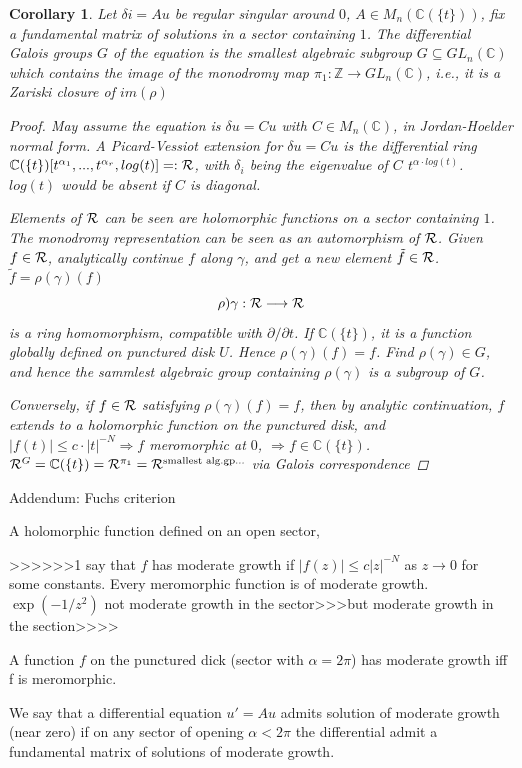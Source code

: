 \documentclass[11pt]{article}
\newtheorem{cor}[thm]{Corollary}
\newcommand{\pd}{\partial}
\newcommand{\cplx}{\mathbb C}
\newcommand{\intg}{\mathbb Z}
\newcommand{\calr}{{\cal R}}
\newcommand{\Lrta}{\Longrightarrow}
\newcommand{\lrta}{\longrightarrow}
\begin{document}
\begin{cor}
Let $\delta i= Au$ be regular singular around $0$, $A\in M_n(\cplx(\{t\}))$, fix a fundamental matrix of solutions in a sector containing $1$. The differential Galois groups $G$ of the equation is the smallest algebraic subgroup $G\subseteq GL_n(\cplx)$ which contains the image of the monodromy map $\pi_1:\intg\lrta GL_n(\cplx)$, i.e., it is a Zariski closure of  $im(\rho)$
\begin{proof}
May assume the equation is $\delta u =C u$ with $C\in M_n(\cplx)$, in Jordan-Hoelder normal form. A Picard-Vessiot extension for $\delta u= C u$ is the differential ring $\cplx(\{t\})[t^{\alpha_1},...,t^{\alpha_r},log(t)]=:\calr$, with $\delta_i$ being the eigenvalue of $C$ $t^{\alpha\cdot log(t)}$. $log(t)$ would be absent if $C$ is diagonal.  

Elements of $\calr$ can be seen are holomorphic functions on a sector containing $1$. The monodromy representation can be seen as an automorphism of $\calr$. Given $f\in\calr$, analytically continue $f$ along $\gamma$, and get a new element $\tilde{f}\in\calr$. $\tilde{f}=\rho(\gamma)(f)$ 
$$
\rho)\gamma: \calr\lrta \calr
$$
 is a ring homomorphism, compatible with $\pd/\pd t$. If $\cplx(\{t\})$, it is a function globally defined on punctured disk $U$. Hence $\rho(\gamma)(f)=f$. Find $\rho(\gamma)\in G$, and hence the sammlest algebraic group containing $\rho(\gamma)$ is a subgroup of $G$.

 Conversely, if $f\in \calr$ satisfying $\rho(\gamma)(f)=f$, then by analytic continuation, $f$ extends to a holomorphic function on the punctured disk, and $|f(t)|\leq c\cdot |t|^{-N}\Lrta f$ meromorphic at $0$, $\Lrta f\in \cplx(\{t\})$. $\calr^G=\cplx(\{t\})=\calr^{\pi_1}=\calr^{\text{smallest alg.gp...}}$ via Galois correspondence
\end{proof}
\end{cor}

Addendum: Fuchs criterion

A holomorphic function defined on an open sector, 

>>>>>>1
say that $f$ has moderate growth if $|f(z)|\leq c|z|^{-N}$ as $z\lrta 0$ for some constants. Every meromorphic function is of moderate growth. $\exp(-1/z^2)$ not moderate growth in the sector>>>but 
moderate growth in the section>>>>

A function $f$ on the punctured dick (sector with $\alpha=2\pi$) has moderate growth iff f is meromorphic.

We say that a differential equation $u'=Au$ admits solution of moderate growth (near zero) if on any sector of opening $\alpha<2\pi$ the differential admit a fundamental matrix of solutions of moderate growth.
\end{document}
